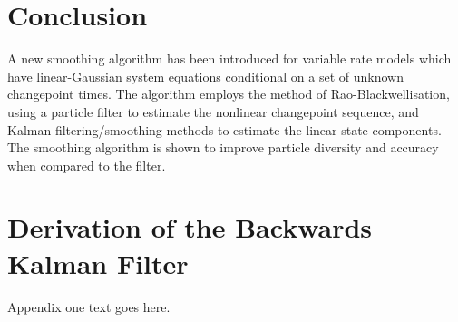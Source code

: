 \documentclass[journal]{IEEEtran}
\begin{document}
%





\section{Conclusion}
A new smoothing algorithm has been introduced for variable rate models which have linear-Gaussian system equations conditional on a set of unknown changepoint times. The algorithm employs the method of Rao-Blackwellisation, using a particle filter to estimate the nonlinear changepoint sequence, and Kalman filtering/smoothing methods to estimate the linear state components. The smoothing algorithm is shown to improve particle diversity and accuracy when compared to the filter.








\appendices
\section{Derivation of the Backwards Kalman Filter} \label{app:backward_filter}
Appendix one text goes here.
\end{document}
